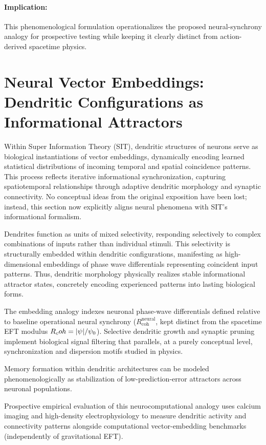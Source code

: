\paragraph{Implication:}
This phenomenological formulation operationalizes the proposed neural-synchrony analogy for prospective testing while keeping it clearly distinct from action-derived spacetime physics.

\section{Neural Vector Embeddings: Dendritic Configurations as Informational Attractors}

Within Super Information Theory (SIT), dendritic structures of neurons serve as biological instantiations of vector embeddings, dynamically encoding learned statistical distributions of incoming temporal and spatial coincidence patterns. This process reflects iterative informational synchronization, capturing spatiotemporal relationships through adaptive dendritic morphology and synaptic connectivity. No conceptual ideas from the original exposition have been lost; instead, this section now explicitly aligns neural phenomena with SIT's informational formalism.

Dendrites function as units of mixed selectivity, responding selectively to complex combinations of inputs rather than individual stimuli. This selectivity is structurally embedded within dendritic configurations, manifesting as high-dimensional embeddings of phase wave differentials representing coincident input patterns. Thus, dendritic morphology physically realizes stable informational attractor states, concretely encoding experienced patterns into lasting biological forms.

The embedding analogy indexes neuronal phase-wave differentials defined relative to baseline operational neural synchrony ($R_{\mathrm{coh}}^{\mathrm{neural}}$, kept distinct from the spacetime EFT modulus $R_coh = |\psi|/\psi_0$). Selective dendritic growth and synaptic pruning implement biological signal filtering that parallels, at a purely conceptual level, synchronization and dispersion motifs studied in physics.

Memory formation within dendritic architectures can be modeled phenomenologically as stabilization of low-prediction-error attractors across neuronal populations.

Prospective empirical evaluation of this neurocomputational analogy uses calcium imaging and high-density electrophysiology to measure dendritic activity and connectivity patterns alongside computational vector-embedding benchmarks (independently of gravitational EFT).

